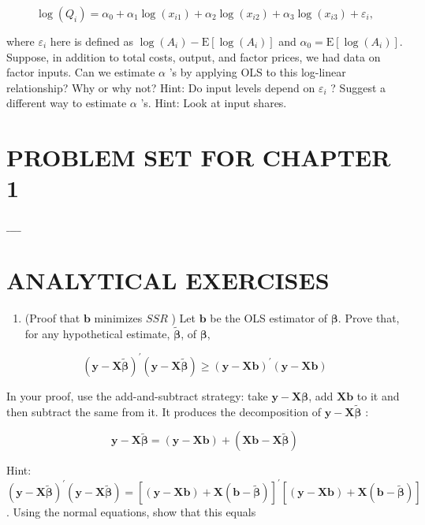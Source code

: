 \documentclass[10pt]{article}
\begin{document}
$$
\log \left(Q_{i}\right)=\alpha_{0}+\alpha_{1} \log \left(x_{i 1}\right)+\alpha_{2} \log \left(x_{i 2}\right)+\alpha_{3} \log \left(x_{i 3}\right)+\varepsilon_{i},
$$

where $\varepsilon_{i}$ here is defined as $\log \left(A_{i}\right)-\mathrm{E}\left[\log \left(A_{i}\right)\right]$ and $\alpha_{0}=\mathrm{E}\left[\log \left(A_{i}\right)\right]$. Suppose, in addition to total costs, output, and factor prices, we had data on factor inputs. Can we estimate $\alpha$ 's by applying OLS to this log-linear relationship? Why or why not? Hint: Do input levels depend on $\varepsilon_{i}$ ? Suggest a different way to estimate $\alpha$ 's. Hint: Look at input shares.

\section*{PROBLEM SET FOR CHAPTER 1}
$\_\_\_\_$

\section*{ANALYTICAL EXERCISES}
\begin{enumerate}
  \item (Proof that $\mathbf{b}$ minimizes $S S R$ ) Let $\mathbf{b}$ be the OLS estimator of $\boldsymbol{\beta}$. Prove that, for any hypothetical estimate, $\widetilde{\boldsymbol{\beta}}$, of $\boldsymbol{\beta}$,
\end{enumerate}

$$
(\mathbf{y}-\mathbf{X} \tilde{\boldsymbol{\beta}})^{\prime}(\mathbf{y}-\mathbf{X} \tilde{\boldsymbol{\beta}}) \geq(\mathbf{y}-\mathbf{X} \mathbf{b})^{\prime}(\mathbf{y}-\mathbf{X} \mathbf{b})
$$

In your proof, use the add-and-subtract strategy: take $\mathbf{y}-\mathbf{X} \boldsymbol{\boldsymbol { \beta }}$, add $\mathbf{X b}$ to it and then subtract the same from it. It produces the decomposition of $\mathbf{y}-\mathbf{X} \widetilde{\boldsymbol{\beta}}$ :

$$
\mathbf{y}-\mathbf{X} \tilde{\boldsymbol{\beta}}=(\mathbf{y}-\mathbf{X} \mathbf{b})+(\mathbf{X} \mathbf{b}-\mathbf{X} \tilde{\boldsymbol{\beta}})
$$

Hint: $(\mathbf{y}-\mathbf{X} \widetilde{\boldsymbol{\beta}})^{\prime}(\mathbf{y}-\mathbf{X} \widetilde{\boldsymbol{\beta}})=[(\mathbf{y}-\mathbf{X b})+\mathbf{X}(\mathbf{b}-\widetilde{\boldsymbol{\beta}})]^{\prime}[(\mathbf{y}-\mathbf{X b})+\mathbf{X}(\mathbf{b}-\widetilde{\boldsymbol{\beta}})]$. Using the normal equations, show that this equals
\end{document}
